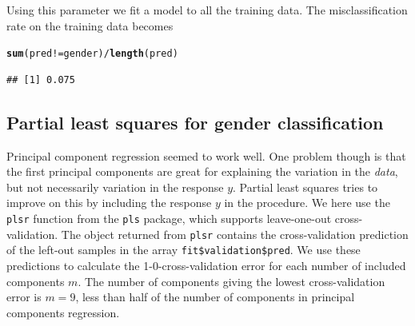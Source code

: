 \documentclass[a4paper]{article}\usepackage[]{graphicx}\usepackage[]{color}
\makeatletter
\newcommand{\hlopt}[1]{\textcolor[rgb]{0,0,0}{#1}}%
\newcommand{\hlstd}[1]{\textcolor[rgb]{0.345,0.345,0.345}{#1}}%
\newcommand{\hlkwd}[1]{\textcolor[rgb]{0.737,0.353,0.396}{\textbf{#1}}}%
\newenvironment{kframe}{%
 \def\at@end@of@kframe{}%
 \ifinner\ifhmode%
  \def\at@end@of@kframe{\end{minipage}}%
  \begin{minipage}{\columnwidth}%
 \fi\fi%
 \def\FrameCommand##1{\hskip\@totalleftmargin \hskip-\fboxsep
 \colorbox{shadecolor}{##1}\hskip-\fboxsep
     \hskip-\linewidth \hskip-\@totalleftmargin \hskip\columnwidth}%
 \MakeFramed {\advance\hsize-\width
   \@totalleftmargin\z@ \linewidth\hsize
   \@setminipage}}%
 {\par\unskip\endMakeFramed%
 \at@end@of@kframe}
\newenvironment{knitrout}{}{} %
\makeatother
\begin{document}
Using this parameter we fit a model to all the training data. The misclassification rate on the training data becomes
\begin{knitrout}
\color{fgcolor}\begin{kframe}
\begin{alltt}
\hlkwd{sum}\hlstd{(pred} \hlopt{!=} \hlstd{gender)} \hlopt{/} \hlkwd{length}\hlstd{(pred)}
\end{alltt}
\begin{verbatim}
## [1] 0.075
\end{verbatim}
\end{kframe}
\end{knitrout}

\subsection{Partial least squares for gender classification}






Principal component regression seemed to work well. One problem though is that the first principal components are great for explaining the variation in the \emph{data}, but not necessarily variation in the response $y$. Partial least squares tries to improve on this by including the response $y$ in the procedure. We here use the \texttt{plsr} function from the \texttt{pls} package, which supports leave-one-out cross-validation. The object returned from \texttt{plsr} contains the cross-validation prediction of the left-out samples in the array \texttt{fit\$validation\$pred}. We use these predictions to calculate the 1-0-cross-validation error for each number of included components $m$. The number of components giving the lowest cross-validation error is $m = 9$, less than half of the number of components in principal components regression.
\end{document}
